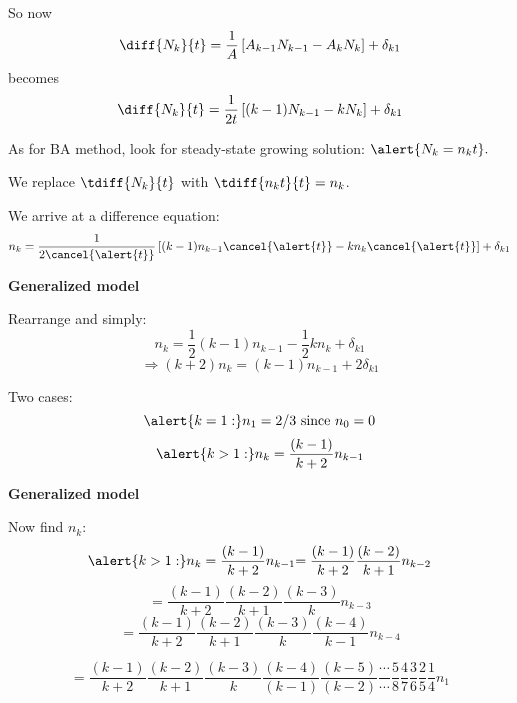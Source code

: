 \begin{frame}[label=]
\begin{frame}[label=]
\begin{frame}[label=]
\begin{frame}[label=]
\begin{frame}[label=]
\begin{frame}[label=]
\begin{frame}[label=]
\begin{frame}[label=]
\begin{frame}[label=]
\begin{frame}[label=]
\begin{frame}[label=]
\begin{frame}[label=]
\begin{frame}[label=]
\begin{frame}[label=]
\begin{frame}[label=]
\begin{frame}[label=]
\begin{frame}[label=]
\begin{frame}[label=]
\begin{frame}[label=]
\begin{frame}[label=]
\begin{frame}[label=]
\begin{frame}[label=]
\begin{frame}[label=]
\begin{frame}[label=]
    So now
    $$
    \diff{N_k}{t}
    =
    \frac{1}{A}
    \left[
      A_{k-1} N_{k-1} - A_{k} N_{k}
    \right]
    + \delta_{k1}
    $$
    becomes
    $$
    \diff{N_k}{t}
    =
    \frac{1}{2t}
    \left[
      (k-1) N_{k-1} - k N_{k}
    \right]
    + \delta_{k1}
    $$
  
    As for BA method, look for steady-state growing solution:
    {
      $
      \alert{N_k = n_k t}.
      $
    }
  
    We replace $\tdiff{N_k}{t}$ with $\tdiff{n_k t}{t} = n_k$.
  
    We arrive at a difference equation:
    $$
    n_k
    =
    \frac{1}{2\cancel{\alert{t}}}
    \left[
      (k-1) n_{k-1}\cancel{\alert{t}} - k n_{k}\cancel{\alert{t}}
    \right]
    + \delta_{k1}
    $$
  


  \textbf{Generalized model}

  
  
    Rearrange and simply:
    $$
    n_k
    =
    \frac{1}{2}
    (k-1) n_{k-1} 
    - 
    \frac{1}{2}
    k n_{k}
    + \delta_{k1}
    $$
    {
      $$
      \Rightarrow
      (k+2)n_k
      =
      (k-1) n_{k-1} 
      + 2\delta_{k1}
      $$
    }
  
    Two cases:
    {
      $$
      \alert{k=1:}
      n_1 = 2/3
      \mbox{\ since $n_0=0$}
      $$
    }
    {
      $$
      \alert{k>1:}
      n_k
      =
      \frac{(k-1)}{k+2} n_{k-1} 
      $$
    }
  
  

  \textbf{Generalized model}

  
   Now find $n_k$:
    $$
    \alert{k>1:}
    n_k
    =
    \frac{(k-1)}{k+2} n_{k-1} 
    {
      =
      \frac{(k-1)}{k+2}
      \frac{(k-2)}{k+1} n_{k-2} 
    }
    $$
    $$
    {
      =
      \frac{(k-1)}{k+2} 
    \frac{(k-2)}{k+1} 
    \frac{(k-3)}{k} n_{k-3} 
    }
    $$
    $$
    {
      =
      \frac{(k-1)}{k+2} 
      \frac{(k-2)}{k+1} 
      \frac{(k-3)}{k} 
      \frac{(k-4)}{k-1} n_{k-4} 
    }
    $$%
    \begin{overprint}%
      $$
      =
      \frac{(k-1)}{k+2} 
      \frac{(k-2)}{k+1} 
      \frac{(k-3)}{k} 
      \frac{(k-4)}{(k-1)} 
      \frac{(k-5)}{(k-2)} 
      \frac{\cdots}{\cdots}
      \frac{5}{8}
      \frac{4}{7}
      \frac{3}{6}
      \frac{2}{5}
      \frac{1}{4}
      n_1
      $$
      

\end{overprint}
\end{frame}
\end{frame}
\end{frame}
\end{frame}
\end{frame}
\end{frame}
\end{frame}
\end{frame}
\end{frame}
\end{frame}
\end{frame}
\end{frame}
\end{frame}
\end{frame}
\end{frame}
\end{frame}
\end{frame}
\end{frame}
\end{frame}
\end{frame}
\end{frame}
\end{frame}
\end{frame}
\end{frame}
